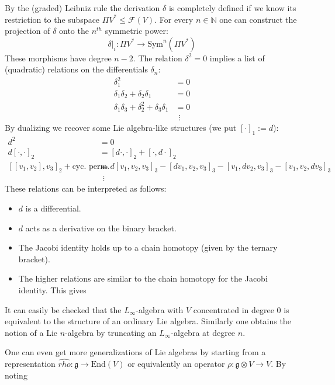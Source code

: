 	By the (graded) Leibniz rule the derivation $\delta$ is completely defined if we know its restriction to the subspace $\Pi V^*\leq\mathcal{F}(V)$. For every $n\in\mathbb{N}$ one can construct the projection of $\delta$ onto the $n^{th}$ symmetric power: \[\delta|_i:\Pi V^*\rightarrow\text{Sym}^n(\Pi V^*)\] These morphisms have degree $n-2$. The relation $\delta^2=0$ implies a list of (quadratic) relations on the differentials $\delta_n$:
	\begin{align*}
		\delta_1^2 &= 0\\
		\delta_1\delta_2+\delta_2\delta_1 &= 0\\
		\delta_1\delta_3+\delta_2^2+\delta_3\delta_1 &= 0\\
		&\ \ \vdots
	\end{align*}
	By dualizing we recover some Lie algebra-like structures (we put $[\cdot]_1:=d$):
	\begin{align*}
		d^2&=0\\
		d[\cdot,\cdot]_2 &= [d\cdot,\cdot]_2+[\cdot,d\cdot]_2\\
		[[v_1,v_2],v_3]_2+\text{cyc. perm.} &= d[v_1,v_2,v_3]_3-[dv_1,v_2,v_3]_3-[v_1,dv_2,v_3]_3-[v_1,v_2,dv_3]_3\\
		&\ \ \vdots
	\end{align*}
	These relations can be interpreted as follows:
	\begin{itemize}
		\item $d$ is a differential.
		\item $d$ acts as a derivative on the binary bracket.
		\item The Jacobi identity holds up to a chain homotopy (given by the ternary bracket).
		\item The higher relations are similar to the chain homotopy for the Jacobi identity. This gives
	\end{itemize}

	
	\begin{example}
		It can easily be checked that the $L_\infty$-algebra with $V$ concentrated in degree 0 is equivalent to the structure of an ordinary Lie algebra. Similarly one obtains the notion of a Lie $n$-algebra by truncating an $L_\infty$-algebra at degree $n$.
	\end{example}
	
	One can even get more generalizations of Lie algebras by starting from a representation $\hat{rho}:\mathfrak{g}\rightarrow\text{End}(V)$ or equivalently an operator $\rho:\mathfrak{g}\otimes V\rightarrow V$. By noting
